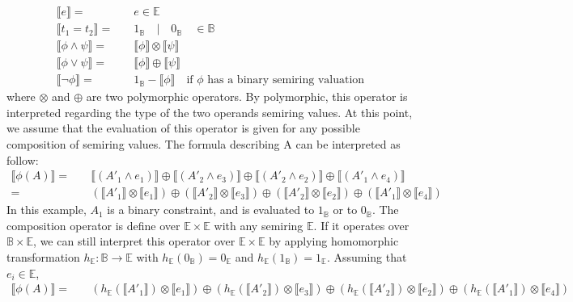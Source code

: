 \documentclass{article}
\theoremstyle{plain}
\theoremstyle{definition}
\begin{document}
\begin{align*}
\llbracket e \rrbracket =  & \quad e \in \mathbb{E} \\
\llbracket t_1=t_2 \rrbracket =  & \quad 1_\mathbb{B} \quad |\quad 0_\mathbb{B} \quad \in \mathbb{B} \\
\llbracket \phi \land \psi \rrbracket =  & \quad \llbracket \phi \rrbracket  \otimes \llbracket \psi \rrbracket \\
\llbracket \phi \lor \psi \rrbracket =  & \quad \llbracket \phi \rrbracket  \oplus \llbracket \psi \rrbracket \\
\llbracket \neg \phi \rrbracket =  & \quad 1_\mathbb{B} - \llbracket \phi \rrbracket \quad  \text{if $\phi$ has a binary semiring valuation}
\end{align*}
where $\otimes$ and $\oplus$ are two polymorphic operators. By polymorphic, this operator is interpreted regarding the type of the two operands semiring values. At this point, we assume that the evaluation of this operator is given for any possible composition of semiring values. The formula describing A can be interpreted as follow:
\begin{align*}
\llbracket \phi(A) \rrbracket =  & \quad \llbracket( A'_1 \land e_{1})\rrbracket \oplus \llbracket( A'_2 \land e_{3})\rrbracket \oplus \llbracket(A'_2 \land e_{2})\rrbracket \oplus \llbracket( A'_1 \land e_{4})\rrbracket \\
					=  & \quad (\llbracket A'_1\rrbracket \otimes \llbracket e_{1}\rrbracket) \oplus (\llbracket A'_2\rrbracket \otimes \llbracket e_{3}\rrbracket) \oplus (\llbracket A'_2\rrbracket \otimes \llbracket e_{2}\rrbracket) \oplus (\llbracket A'_1\rrbracket \otimes \llbracket e_{4}\rrbracket)
\end{align*}
In this example, $A_1$ is a binary constraint, and is evaluated to $1_\mathbb{B}$ or to $0_\mathbb{B}$. The composition operator is define over $\mathbb{E}\times\mathbb{E}$ with any semiring $\mathbb{E}$. If it operates over $\mathbb{B}\times\mathbb{E}$, we can still interpret this operator over $\mathbb{E}\times\mathbb{E}$ by applying homomorphic transformation $h_\mathbb{E}:\mathbb{B} \to \mathbb{E}$ with $h_\mathbb{E}(0_\mathbb{B})=0_\mathbb{E}$ and $h_\mathbb{E}(1_\mathbb{B})=1_\mathbb{E}$. Assuming that $e_i \in \mathbb{E}$,  
\begin{align*}
\llbracket \phi(A) \rrbracket =  & \quad (h_\mathbb{E}(\llbracket A'_1\rrbracket) \otimes \llbracket e_{1}\rrbracket) \oplus (h_\mathbb{E}(\llbracket A'_2\rrbracket) \otimes \llbracket e_{3}\rrbracket) \oplus (h_\mathbb{E}(\llbracket A'_2\rrbracket) \otimes \llbracket e_{2}\rrbracket) \oplus (h_\mathbb{E}(\llbracket A'_1\rrbracket) \otimes \llbracket e_{4}\rrbracket)
\end{align*}
\end{document}
